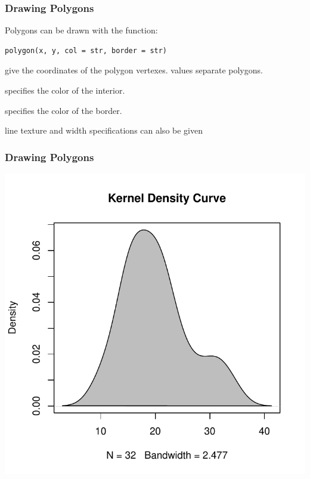 \documentclass[12pt]{beamer}\usepackage[]{graphicx}\usepackage[]{color}
\newenvironment{knitrout}{}{} %
\begin{document}

\begin{frame}[fragile]
\frametitle{Drawing Polygons}

Polygons can be drawn with the function:
\begin{verbatim}
polygon(x, y, col = str, border = str)
\end{verbatim}

\bi
  \item {} give the coordinates of the polygon vertexes.  values separate polygons.
  \item {} specifies the color of the interior.
  \item {} specifies the color of the border.
  \item line texture and width specifications can also be given
\ei

\end{frame}


\begin{frame}[fragile]
\frametitle{Drawing Polygons}
\begin{knitrout}\scriptsize
{}\color{fgcolor}

{\centering \includegraphics[width=.6\linewidth,height=.6\linewidth]{figure/polygons-1} 

}



\end{knitrout}
\end{frame}

\end{document}
